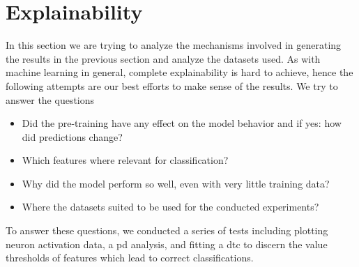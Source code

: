





\clearpage











\FloatBarrier

\section{Explainability} \label{sec:results:explainability}

In this section we are trying to analyze the mechanisms involved in generating the results in the previous section and analyze the datasets used. As with machine learning in general, complete explainability is hard to achieve, hence the following attempts are our best efforts to make sense of the results. We try to answer the questions

\begin{itemize}
	\item Did the pre-training have any effect on the model behavior and if yes: how did predictions change?
	\item Which features where relevant for classification? 
	\item Why did the model perform so well, even with very little training data?
	\item Where the datasets suited to be used for the conducted experiments?
\end{itemize}

To answer these questions, we conducted a series of tests including plotting neuron activation data, a \gls{pd} analysis, and fitting a \gls{dtc} to discern the value thresholds of features which lead to correct classifications. 

